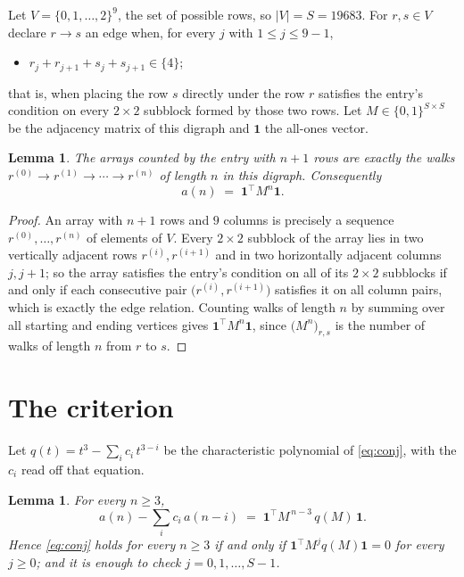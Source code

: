 \documentclass[11pt,a4paper]{article}
\theoremstyle{plain}
\newtheorem{lemma}[theorem]{Lemma}
\theoremstyle{definition}
\begin{document}
Let $V=\{0,1,\dots,2\}^{9}$, the set of possible rows, so $|V|=S=19683$. For
$r,s\in V$ declare $r\to s$ an edge when, for every $j$ with $1\le j\le 9-1$,
\begin{itemize}
\item $r_j+r_{j+1}+s_j+s_{j+1}\in\{4\}$;

\end{itemize}
that is, when placing the row $s$ directly under the row $r$ satisfies the entry's
condition on every $2\times2$ subblock formed by those two rows. Let $M\in\{0,1\}^{S\times
S}$ be the adjacency matrix of this digraph and $\mathbf{1}$ the all-ones vector.

\begin{lemma}\label{lem:walk}
The arrays counted by the entry with $n+1$ rows are exactly the walks
$r^{(0)}\to r^{(1)}\to\cdots\to r^{(n)}$ of length $n$ in this digraph. Consequently
\[
a(n)\;=\;\mathbf{1}^{\!\top}M^{n}\mathbf{1} .
\]
\end{lemma}

\begin{proof}
An array with $n+1$ rows and $9$ columns is precisely a sequence
$r^{(0)},\dots,r^{(n)}$ of elements of $V$. Every $2\times2$ subblock of the array lies
in two vertically adjacent rows $r^{(i)},r^{(i+1)}$ and in two horizontally adjacent
columns $j,j+1$; so the array satisfies the entry's condition on all of its $2\times2$
subblocks if and only if each consecutive pair $\bigl(r^{(i)},r^{(i+1)}\bigr)$ satisfies
it on all column pairs, which is exactly the edge relation. Counting walks of length $n$ by
summing over all starting and ending vertices gives
$\mathbf{1}^{\!\top}M^{n}\mathbf{1}$, since
$\bigl(M^{n}\bigr)_{r,s}$ is the number of walks of length $n$ from $r$ to $s$.
\end{proof}

\section{The criterion}

Let $q(t)=t^{3}-\sum_{i}c_i\,t^{3-i}$ be the characteristic polynomial of
\eqref{eq:conj}, with the $c_i$ read off that equation.

\begin{lemma}\label{lem:crit}
For every $n\ge3$,
\[
a(n)-\sum_i c_i\,a(n-i)\;=\;\mathbf{1}^{\!\top}M^{\,n-3}\,q(M)\,\mathbf{1} .
\]
Hence \eqref{eq:conj} holds for every $n\ge3$ if and only if
$\mathbf{1}^{\!\top}M^{j}q(M)\mathbf{1}=0$ for every $j\ge0$; and it is enough to
check $j=0,1,\dots,S-1$.
\end{lemma}
\end{document}
